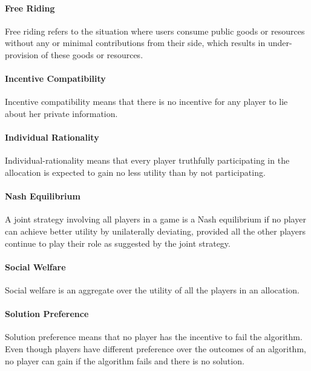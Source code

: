 \paragraph{Free Riding} 
Free riding refers to the situation where users consume public goods or resources 
without any or minimal contributions from their side,
which results in under-provision of these goods or resources.

\paragraph{Incentive Compatibility}
Incentive compatibility means that there is no incentive for any player to lie about her private information. %

\paragraph{Individual Rationality}
Individual-rationality means that every player 
truthfully participating in the allocation is expected to gain no less utility than by not participating. %


\paragraph{Nash Equilibrium}
A joint strategy involving all players in a game is a Nash equilibrium 
if no player can achieve better utility
by unilaterally deviating, provided all the other players continue
to play their role as suggested by the joint strategy.

\paragraph{Social Welfare}
Social welfare is an aggregate over the utility of all the players in an allocation.

\paragraph{Solution Preference}
Solution preference means that no player has the incentive to fail the algorithm.
Even though players have different preference over the outcomes of an algorithm, 
no player can gain if the algorithm fails and there is no solution.

